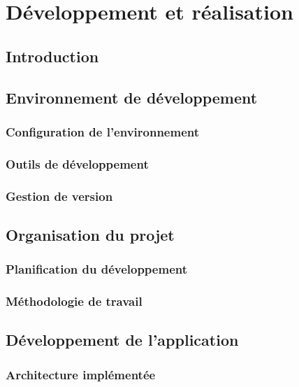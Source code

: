 \chapter{Développement et réalisation}

\section{Introduction}

\section{Environnement de développement}

\subsection{Configuration de l'environnement}

\subsection{Outils de développement}

\subsection{Gestion de version}

\section{Organisation du projet}

\subsection{Planification du développement}

\subsection{Méthodologie de travail}

\section{Développement de l'application}

\subsection{Architecture implémentée}

